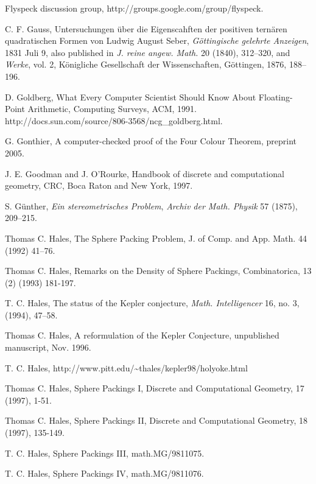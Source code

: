 \begin{thebibliography}{CHMS94}
  Flyspeck discussion group,
http://groups.google.com/group/flyspeck.

 C. F. Gauss, Untersuchungen \"uber die Eigenscahften der
positiven tern\"aren quadratischen Formen von Ludwig August Seber,
    {\it G\"ottingische gelehrte Anzeigen}, 1831 Juli 9,
also published in {\it J. reine angew. Math.} 20 (1840), 312--320,
and
    {\it Werke},  vol. 2,
    K\"onigliche Gesellschaft der Wissenschaften, G\"ottingen,
            1876, 188--196.

 D. Goldberg, What Every Computer Scientist Should
Know About Floating-Point Arithmetic, Computing Surveys, ACM, 1991.
http://docs.sun.com/source/806-3568/ncg\_goldberg.html.

 G. Gonthier, A computer-checked proof of the Four
Colour Theorem, preprint 2005.

 J. E. Goodman and J. O'Rourke, Handbook of discrete and
    computational geometry, CRC, Boca Raton and New York, 1997.

 S. G\"unther, {\it Ein stereometrisches Problem},
{\it Archiv der Math. Physik} 57 (1875), 209--215.

 Thomas C. Hales, The Sphere Packing Problem, J. of Comp.
and App. Math. 44 (1992) 41--76.

 Thomas C. Hales, Remarks on the Density of Sphere Packings,
        Combinatorica, 13 (2) (1993) 181-197.

 T. C. Hales, The status of the Kepler conjecture,
    {\it Math. Intelligencer} 16, no. 3, (1994), 47--58.

 Thomas C. Hales, A reformulation of the
Kepler Conjecture, unpublished manuscript, Nov. 1996.

 T. C. Hales,
    {http://www.pitt.edu/\~\relax thales/kepler98/holyoke.html}

 Thomas C. Hales, Sphere Packings I,
    Discrete and Computational Geometry, 17 (1997), 1-51.

 Thomas C. Hales, Sphere Packings II,
    Discrete and Computational Geometry, 18 (1997), 135-149.

 T. C. Hales, Sphere Packings III, math.MG/9811075.

 T. C. Hales, Sphere Packings IV, math.MG/9811076.


\end{thebibliography}
